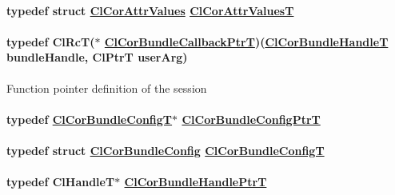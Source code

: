 \hypertarget{group__group13_ga11}{
\paragraph[ClCorAttrValuesT]{\setlength{\rightskip}{0pt plus 5cm}typedef struct \hyperlink{struct_cl_cor_attr_values}{Cl\-Cor\-Attr\-Values} \hyperlink{struct_cl_cor_attr_values}{Cl\-Cor\-Attr\-Values\-T}}\hfill}
\label{group__group13_ga11}


\hypertarget{group__group13_ga56}{
\paragraph[ClCorBundleCallbackPtrT]{\setlength{\rightskip}{0pt plus 5cm}typedef Cl\-Rc\-T($\ast$ \hyperlink{group__group13_ga56}{Cl\-Cor\-Bundle\-Callback\-Ptr\-T})(\hyperlink{group__group13_ga7}{Cl\-Cor\-Bundle\-Handle\-T} bundle\-Handle, Cl\-Ptr\-T user\-Arg)}\hfill}
\label{group__group13_ga56}


Function pointer definition of the session \hypertarget{group__group13_ga52}{
\paragraph[ClCorBundleConfigPtrT]{\setlength{\rightskip}{0pt plus 5cm}typedef \hyperlink{struct_cl_cor_bundle_config}{Cl\-Cor\-Bundle\-Config\-T}$\ast$ \hyperlink{struct_cl_cor_bundle_config}{Cl\-Cor\-Bundle\-Config\-Ptr\-T}}\hfill}
\label{group__group13_ga52}


\hypertarget{group__group13_ga51}{
\paragraph[ClCorBundleConfigT]{\setlength{\rightskip}{0pt plus 5cm}typedef struct \hyperlink{struct_cl_cor_bundle_config}{Cl\-Cor\-Bundle\-Config} \hyperlink{struct_cl_cor_bundle_config}{Cl\-Cor\-Bundle\-Config\-T}}\hfill}
\label{group__group13_ga51}


\hypertarget{group__group13_ga8}{
\paragraph[ClCorBundleHandlePtrT]{\setlength{\rightskip}{0pt plus 5cm}typedef Cl\-Handle\-T$\ast$ \hyperlink{group__group13_ga8}{Cl\-Cor\-Bundle\-Handle\-Ptr\-T}}\hfill}
\label{group__group13_ga8}


